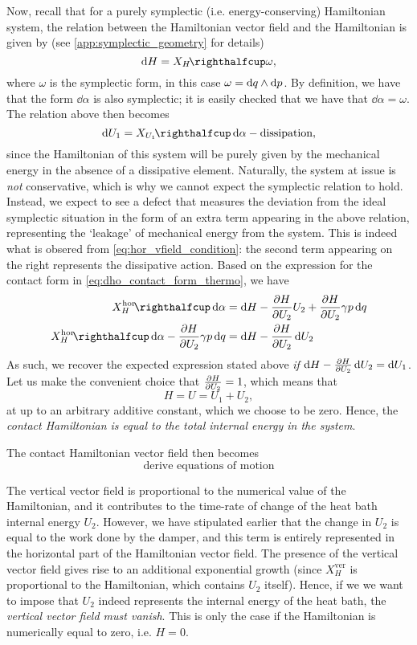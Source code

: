 Now, recall that for a purely symplectic (i.e. energy-conserving) Hamiltonian system, the relation between the Hamiltonian vector field and the Hamiltonian is given by (see \cref{app:symplectic_geometry} for details) 
$$ \dd{H} = \intpr{X_H}{\omega}, $$
where $\omega$ is the symplectic form, in this case $\omega =  \dd{q}\wedge\dd{p} $. By definition, we have that the form $\dd{\alpha}$ is also symplectic; it is easily checked that we have that $\dd{\alpha} = \omega$. The relation above then becomes 
$$ \dd{U_1} = \intpr{X_{U_1}}{\dd{\alpha}} - \text{dissipation}, $$
since the Hamiltonian of this system will be purely given by the mechanical energy in the absence of a dissipative element. Naturally, the system at issue is \emph{not} conservative, which is why we cannot expect the symplectic relation to hold. Instead, we expect to see a defect that measures the deviation from the ideal symplectic situation in the form of an extra term appearing in the above relation, representing the `leakage' of mechanical energy from the system. This is indeed what is obsered from \cref{eq:hor_vfield_condition}: the second term appearing on the right represents the dissipative action. Based on the expression for the contact form in \cref{eq:dho_contact_form_thermo}, we have
\begin{equation} 
    \begin{split}
        \intpr{X_H^\text{hor}}{\dd{\alpha}} &= \dd{H}  - \pdv{H}{U_2}U_2 + \pdv{H}{U_2}\gamma p\dd{q} \\
        \intpr{X_H^\text{hor}}{\dd{\alpha}} - \pdv{H}{U_2}\gamma p\dd{q} &= \dd{H}  - \pdv{H}{U_2}\dd{U_2}
    \end{split}
\end{equation}
As such, we recover the expected expression stated above \emph{if} $\dd{H} - \pdv{H}{U_2}\dd{U_2} = \dd{U_1}$. Let us make the convenient choice that $\pdv{H}{U_2} = 1$, which means that 
$$ H = U = U_1 + U_2, $$
at up to an arbitrary additive constant, which we choose to be zero. Hence, the \emph{contact Hamiltonian is equal to the total internal energy in the system}.

The contact Hamiltonian vector field then becomes  
$$ \text{derive equations of motion} $$

The vertical vector field is proportional to the numerical value of the Hamiltonian, and it contributes to the time-rate of change of the heat bath internal energy $U_2$. However, we have stipulated earlier that the change in $U_2$ is equal to the work done by the damper, and this term is entirely represented in the horizontal part of the Hamiltonian vector field. The presence of the vertical vector field gives rise to an additional exponential growth (since $X_H^\text{ver}$ is proportional to the Hamiltonian, which contains $U_2$ itself). Hence, if we we want to impose that $U_2$ indeed represents the internal energy of the heat bath, the \emph{vertical vector field must vanish}. This is only the case if the Hamiltonian is numerically equal to zero, i.e. $H = 0$.

